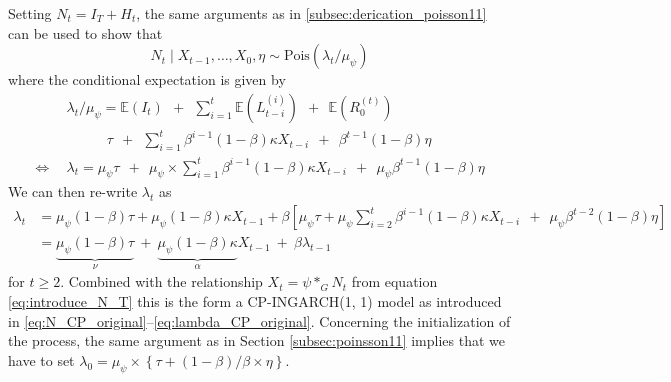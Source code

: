 \documentclass{article}
\begin{document}
Setting $N_t = I_T + H_t$, the same arguments as in \eqref{subsec:derication_poisson11} can be used to show that
$$
N_t \mid X_{t - 1}, \dots, X_0, \eta \sim \text{Pois}(\lambda_t/\mu_\psi)
$$
where the conditional expectation is given by
\begin{align*}
& \lambda_t/\mu_\psi = \mathbb{E}(I_t) \ \ + \ \ \sum_{i = 1}^t \mathbb{E}(L_{t - i}^{(i)}) \ \ + \ \ \mathbb{E}(R_0^{(t)})\\
& \ \ \ \ \ \ \ \ \ \ \ \ \ \tau \ \ + \ \ \sum_{i = 1}^t \beta^{i - 1}(1 - \beta)\kappa X_{t - i} \ \ + \ \ \beta^{t - 1}(1 - \beta)\eta\\
\Leftrightarrow \ \ & \lambda_t = \mu_\psi \tau \ \ + \ \ \mu_\psi \times \sum_{i = 1}^t \beta^{i - 1}(1 - \beta)\kappa X_{t - i} \ \ + \ \ \mu_\psi\beta^{t - 1}(1 - \beta)\eta
\end{align*}
We can then re-write $\lambda_t$ as
\begin{align*}
\lambda_t & = \mu_\psi(1 - \beta)\tau + \mu_\psi(1 - \beta)\kappa X_{t - 1} + \beta \left[\mu_\psi\tau +   \mu_\psi \sum_{i = 2}^t \beta^{i - 1}(1 - \beta)\kappa X_{t - i}  \ \ + \ \ \mu_\psi\beta^{t - 2}(1 - \beta)\eta\right]\\
& = \underbrace{\mu_\psi(1 - \beta)\tau}_{\nu} \ + \ \underbrace{\mu_\psi(1 - \beta)\kappa}_{\alpha} X_{t - 1} \ + \ \beta \lambda_{t - 1}
\end{align*}
for $t \geq 2$. Combined with the relationship $X_t = \psi *_G N_t$ from equation \eqref{eq:introduce_N_T} this is the form a CP-INGARCH(1, 1) model as introduced in \eqref{eq:N_CP_original}--\eqref{eq:lambda_CP_original}. Concerning the initialization of the process, the same argument as in Section \ref{subsec:poinsson11} implies that we have to set $\lambda_0 = \mu_\psi\times \left\{\tau + (1 - \beta)/\beta \times \eta\right\}$.






\end{document}
